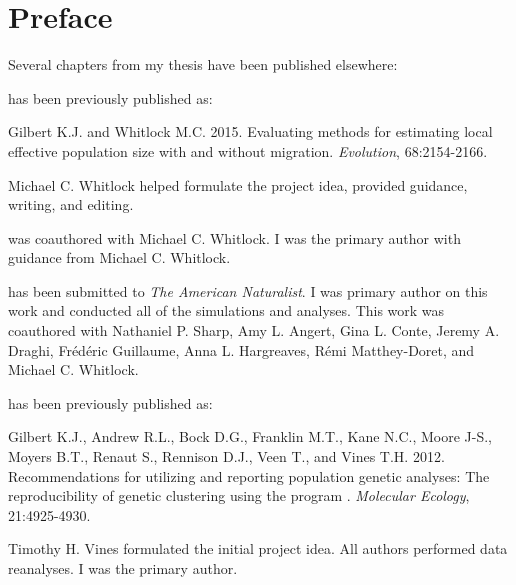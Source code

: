 \chapter*{Preface}

Several chapters from my thesis have been published elsewhere:

\textsc{} has been previously published as:
%
\begin{previouspaper}
  Gilbert K.J. and Whitlock M.C. 2015. Evaluating methods for estimating local effective 
  population size with and without migration. \emph{Evolution}, 68:2154-2166.
\end{previouspaper}
%
Michael C. Whitlock helped formulate the project idea, provided guidance, writing, and editing.

\textsc{} was coauthored with Michael C. Whitlock. I was the primary author with guidance from Michael C. Whitlock.

\textsc{} has been submitted to \emph{The American Naturalist}. I was primary author on this work and conducted all of the simulations and analyses. This work was coauthored with Nathaniel P. Sharp, Amy L. Angert, Gina L. Conte, Jeremy A. Draghi, Fr\'ed\'eric Guillaume, Anna L. Hargreaves, R\'emi Matthey-Doret, and Michael C. Whitlock.

\textsc{} has been previously published as:
%
\begin{previouspaper}
  Gilbert K.J., Andrew R.L., Bock D.G., Franklin M.T., Kane N.C., Moore J-S., Moyers B.T., Renaut S., Rennison D.J., Veen T., and Vines T.H. 2012. Recommendations for utilizing and reporting population genetic analyses: The reproducibility of genetic clustering using the program . \emph{Molecular Ecology}, 21:4925-4930.
\end{previouspaper}
%
Timothy H. Vines formulated the initial project idea. All authors performed data reanalyses. I was the primary author.

